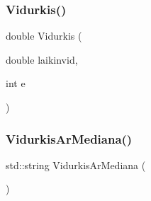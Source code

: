 \subsubsection{\texorpdfstring{Vidurkis()}{Vidurkis()}}
{\footnotesize\ttfamily double Vidurkis (\begin{DoxyParamCaption}\item[{double}]{laikinvid,  }\item[{int}]{e }\end{DoxyParamCaption})}

\mbox{\label{_komandos-_x_8cpp_ac18b091e5da5d98faf40a60e2dfac1c3}} 
\subsubsection{\texorpdfstring{VidurkisArMediana()}{VidurkisArMediana()}}
{\footnotesize\ttfamily std\+::string Vidurkis\+Ar\+Mediana (\begin{DoxyParamCaption}{ }\end{DoxyParamCaption})}

